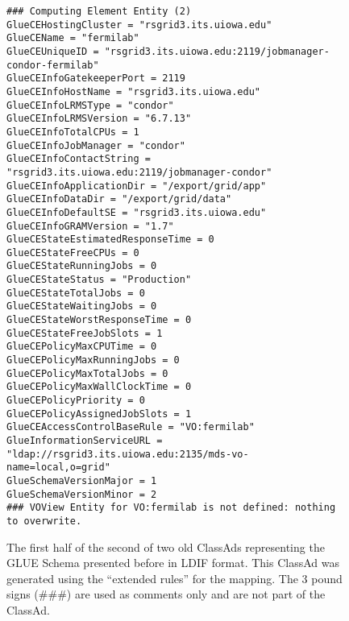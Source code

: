 \documentclass[12pt]{article}
\begin{document}
\begin{figure}
\scriptsize
\begin{verbatim}
### Computing Element Entity (2)
GlueCEHostingCluster = "rsgrid3.its.uiowa.edu"
GlueCEName = "fermilab"
GlueCEUniqueID = "rsgrid3.its.uiowa.edu:2119/jobmanager-condor-fermilab"
GlueCEInfoGatekeeperPort = 2119
GlueCEInfoHostName = "rsgrid3.its.uiowa.edu"
GlueCEInfoLRMSType = "condor"
GlueCEInfoLRMSVersion = "6.7.13"
GlueCEInfoTotalCPUs = 1
GlueCEInfoJobManager = "condor"
GlueCEInfoContactString = "rsgrid3.its.uiowa.edu:2119/jobmanager-condor"
GlueCEInfoApplicationDir = "/export/grid/app"
GlueCEInfoDataDir = "/export/grid/data"
GlueCEInfoDefaultSE = "rsgrid3.its.uiowa.edu"
GlueCEInfoGRAMVersion = "1.7"
GlueCEStateEstimatedResponseTime = 0
GlueCEStateFreeCPUs = 0
GlueCEStateRunningJobs = 0
GlueCEStateStatus = "Production"
GlueCEStateTotalJobs = 0
GlueCEStateWaitingJobs = 0
GlueCEStateWorstResponseTime = 0
GlueCEStateFreeJobSlots = 1
GlueCEPolicyMaxCPUTime = 0
GlueCEPolicyMaxRunningJobs = 0
GlueCEPolicyMaxTotalJobs = 0
GlueCEPolicyMaxWallClockTime = 0
GlueCEPolicyPriority = 0
GlueCEPolicyAssignedJobSlots = 1
GlueCEAccessControlBaseRule = "VO:fermilab"
GlueInformationServiceURL = "ldap://rsgrid3.its.uiowa.edu:2135/mds-vo-name=local,o=grid"
GlueSchemaVersionMajor = 1
GlueSchemaVersionMinor = 2
### VOView Entity for VO:fermilab is not defined: nothing to overwrite.
\end{verbatim}
\normalsize \caption[Example of an old ClassAd representation of the
GLUE Schema]{\label{CLASSAD-Extended-2-Example-part1} The first half
of the second of two old ClassAds representing the GLUE Schema
presented before in LDIF format. This ClassAd was generated using
the ``extended rules'' for the mapping. The 3 pound signs (\#\#\#)
are used as comments only and are not part of the ClassAd.}
\end{figure}
\end{document}

